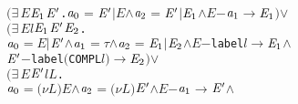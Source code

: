 \documentclass[GCNS]{yincog}
\renewcommand{\HOLConst}[1]{\texttt{#1}}
\renewcommand{\HOLBoundVar}[1]{\ensuremath{\mathit{#1}}}
\renewcommand{\HOLSymConst}[1]{#1}
\renewcommand{\HOLTokenConj}{\ensuremath{\wedge}}
\renewcommand{\HOLTokenExists}{\ensuremath{\exists \,}}
\renewcommand{\HOLTokenDisj}{\ensuremath{\vee}}
\theoremstyle{remark}
\theoremstyle{theorem}
\theoremstyle{remark}
\newcommand{\HOLTokenTransBegin}{$-$}
\newcommand{\HOLTokenTransEnd}{$\rightarrow$\xspace}
\begin{document}
\begin{itemize}
\begin{alltt}
       \ensuremath{(}\HOLSymConst{\HOLTokenExists{}}\HOLBoundVar{E} \ensuremath{\HOLBoundVar{E}\sb{\mathrm{1}}} \ensuremath{\HOLBoundVar{E}\sp{\prime}}. \ensuremath{\HOLBoundVar{a}\sb{\mathrm{0}}} \HOLSymConst{\ensuremath{=}} \ensuremath{\HOLBoundVar{E}\sp{\prime}} \HOLSymConst{\ensuremath{\mid}} \HOLBoundVar{E} \HOLSymConst{\HOLTokenConj{}} \ensuremath{\HOLBoundVar{a}\sb{\mathrm{2}}} \HOLSymConst{\ensuremath{=}} \ensuremath{\HOLBoundVar{E}\sp{\prime}} \HOLSymConst{\ensuremath{\mid}} \ensuremath{\HOLBoundVar{E}\sb{\mathrm{1}}} \HOLSymConst{\HOLTokenConj{}} \HOLBoundVar{E} \HOLTokenTransBegin\ensuremath{\HOLBoundVar{a}\sb{\mathrm{1}}}\HOLTokenTransEnd \ensuremath{\HOLBoundVar{E}\sb{\mathrm{1}}}\ensuremath{)} \HOLSymConst{\HOLTokenDisj{}}
       \ensuremath{(}\HOLSymConst{\HOLTokenExists{}}\HOLBoundVar{E} \HOLBoundVar{l} \ensuremath{\HOLBoundVar{E}\sb{\mathrm{1}}} \ensuremath{\HOLBoundVar{E}\sp{\prime}} \ensuremath{\HOLBoundVar{E}\sb{\mathrm{2}}}.
            \ensuremath{\HOLBoundVar{a}\sb{\mathrm{0}}} \HOLSymConst{\ensuremath{=}} \HOLBoundVar{E} \HOLSymConst{\ensuremath{\mid}} \ensuremath{\HOLBoundVar{E}\sp{\prime}} \HOLSymConst{\HOLTokenConj{}} \ensuremath{\HOLBoundVar{a}\sb{\mathrm{1}}} \HOLSymConst{\ensuremath{=}} \HOLSymConst{\ensuremath{\tau}} \HOLSymConst{\HOLTokenConj{}} \ensuremath{\HOLBoundVar{a}\sb{\mathrm{2}}} \HOLSymConst{\ensuremath{=}} \ensuremath{\HOLBoundVar{E}\sb{\mathrm{1}}} \HOLSymConst{\ensuremath{\mid}} \ensuremath{\HOLBoundVar{E}\sb{\mathrm{2}}} \HOLSymConst{\HOLTokenConj{}} \HOLBoundVar{E} \HOLTokenTransBegin\HOLConst{label} \HOLBoundVar{l}\HOLTokenTransEnd \ensuremath{\HOLBoundVar{E}\sb{\mathrm{1}}} \HOLSymConst{\HOLTokenConj{}}
            \ensuremath{\HOLBoundVar{E}\sp{\prime}} \HOLTokenTransBegin\HOLConst{label} \ensuremath{(}\HOLConst{COMPL} \HOLBoundVar{l}\ensuremath{)}\HOLTokenTransEnd \ensuremath{\HOLBoundVar{E}\sb{\mathrm{2}}}\ensuremath{)} \HOLSymConst{\HOLTokenDisj{}}
       \ensuremath{(}\HOLSymConst{\HOLTokenExists{}}\HOLBoundVar{E} \ensuremath{\HOLBoundVar{E}\sp{\prime}} \HOLBoundVar{l} \HOLBoundVar{L}.
            \ensuremath{\HOLBoundVar{a}\sb{\mathrm{0}}} \HOLSymConst{\ensuremath{=}} \ensuremath{(\nu}\HOLBoundVar{L}\ensuremath{)} \HOLBoundVar{E} \HOLSymConst{\HOLTokenConj{}} \ensuremath{\HOLBoundVar{a}\sb{\mathrm{2}}} \HOLSymConst{\ensuremath{=}} \ensuremath{(\nu}\HOLBoundVar{L}\ensuremath{)} \ensuremath{\HOLBoundVar{E}\sp{\prime}} \HOLSymConst{\HOLTokenConj{}} \HOLBoundVar{E} \HOLTokenTransBegin\ensuremath{\HOLBoundVar{a}\sb{\mathrm{1}}}\HOLTokenTransEnd \ensuremath{\HOLBoundVar{E}\sp{\prime}} \HOLSymConst{\HOLTokenConj{}}

\end{alltt}
\end{itemize}
\end{document}
